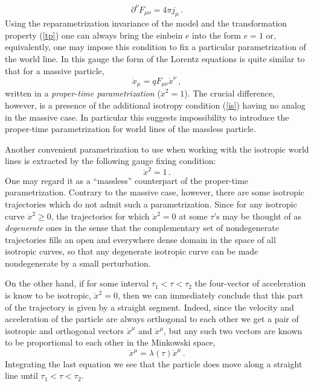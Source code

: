 \documentclass[a4paper,12pt]{article}
\begin{document}
\begin{equation} \label{meq}
\partial^{\nu}F_{\mu\nu}=4\pi{}j_{\mu}\,.
\end{equation}
Using the reparametrization invariance of the model and the
transformation property (\ref{tp}) one can always bring the
einbein $e$ into the form $e=1$ or, equivalently, one may impose
this condition to fix a particular parametrization of the world
line. In this gauge the form of the Lorentz equations is quite
similar to that for a  massive particle,
\begin{equation} \label{feqm}
\ddot{x}_\mu=qF_{\mu\nu}\dot{x}^{\nu}\,,
\end{equation}
written in a \textit{proper-time parametrization} ($\dot{x}^2=1$).
The crucial difference, however, is a presence of the additional
isotropy condition (\ref{is}) having no analog in the massive
case. In particular this suggests impossibility to introduce the
proper-time parametrization for world lines of the massless
particle.

Another convenient  parametrization to use when working with the
isotropic world lines is extracted by the following gauge fixing
condition:
\begin{equation}\label{gfc}
\ddot{x}^2=1\,.
\end{equation}
One may regard it as a ``massless'' counterpart of the
proper-time parametrization. Contrary to the massive case,
however, there are some isotropic trajectories which do not admit
such a parametrization. Since for any isotropic curve
$\ddot{x}^2\geq 0$, the trajectories for which $\ddot{x}^2=0$ at
some  $\tau$'s may be thought of as \textit{degenerate} ones in
the sense that the complementary set of nondegenerate trajectories
fills an open and everywhere dense domain in the space of all
isotropic curves, so that any degenerate isotropic curve can be
made nondegenerate by a small perturbation.

On the other hand, if for some interval $\tau_1<\tau<\tau_2$ the
four-vector of acceleration is know to be isotropic,
$\ddot{x}^2=0$, then we can immediately conclude that this part of
the trajectory is given by a straight segment. Indeed, since the
velocity and acceleration of the particle are always orthogonal to
each other we get a pair of isotropic and orthogonal vectors
$\dot{x}^\mu$ and $\ddot{x}^\mu$, but any such two vectors are
known to be proportional to each other in the Minkowski space,
\begin{equation}\label{}
  \ddot{x}^\mu=\lambda(\tau)\dot{x}^\mu\,.
\end{equation}
Integrating the last equation we see that the particle does move
along a straight line until $\tau_1<\tau <\tau_2$.
\end{document}
